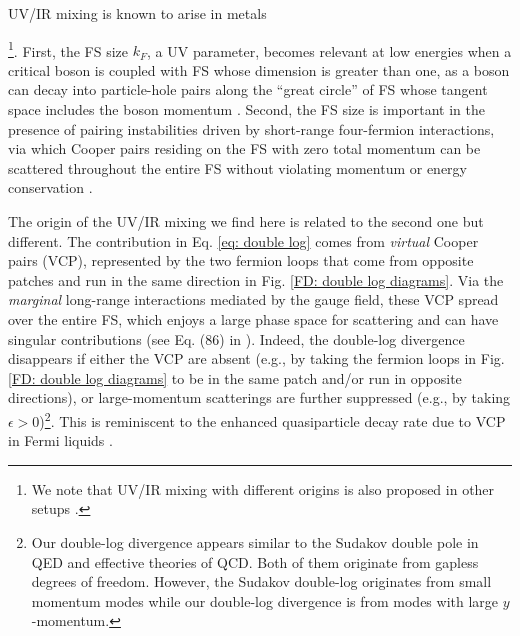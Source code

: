 \documentclass[prl,amsmath,amssymb, notitlepage, twocolumn,
nofootinbib,
superscriptaddress,
longbibliography
]{revtex4-1}
\newcommand{\eg}{{e.g., }}
\begin{document}
UV/IR mixing is known to arise 
in metals {\footnote{We note that UV/IR mixing with different origins is also proposed in other setups \cite{Ghamari2014, Shao2020, You2021, Shackleton2021, Zhou2021}.}. 
First, the FS size $k_F$, a UV parameter,
becomes relevant at low energies when a critical boson is coupled with FS
whose dimension is greater than one, as a boson can decay into particle-hole pairs along the ``great circle'' of FS whose tangent space includes the boson momentum \cite{Mandal2015,Mandal2016}.
Second, the FS size is important in the presence of pairing instabilities driven by short-range four-fermion interactions, via which Cooper pairs residing on the FS with zero total momentum can be scattered throughout the entire FS without violating momentum or energy conservation \cite{Cooper1956, Metlitski2014,Wang2016}.

The origin of the UV/IR mixing we find here is related to the second one but different. The contribution in Eq. \eqref{eq: double log} comes from {\it virtual} Cooper pairs (VCP), represented by the two fermion loops that come from opposite patches and run in the same direction in Fig. \ref{FD: double log diagrams}. Via the {\it marginal} long-range interactions mediated by the gauge field, these VCP spread over the entire FS, which enjoys a large phase space for scattering and can have singular contributions (see Eq. (86) in \cite{supp}).
Indeed, the double-log divergence disappears if either the VCP are absent (\eg by taking the fermion loops in Fig. \ref{FD: double log diagrams} to be in the same patch 
and/or run in opposite directions), or large-momentum scatterings are further suppressed (\eg by taking $\epsilon>0$)\footnote{
Our double-log divergence appears similar to the Sudakov double pole \cite{Peskin1995, Stewart2013} in QED and effective theories of QCD.
Both of them originate from gapless degrees of freedom.
However, the Sudakov double-log originates from small momentum modes
while our double-log divergence is from modes with large $y$-momentum.
}. 
This is reminiscent to the enhanced quasiparticle decay rate due to VCP in Fermi liquids \cite{Pimenov2021}.

}
\end{document}
